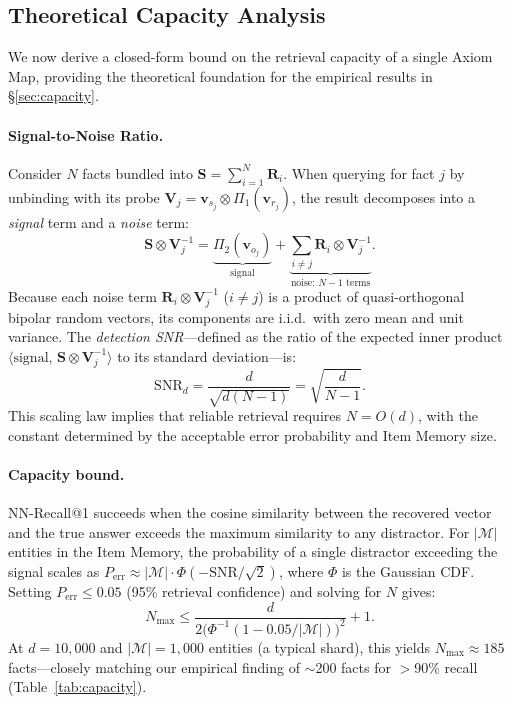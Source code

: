 \documentclass[11pt,a4paper]{article}
\begin{document}
\subsection{Theoretical Capacity Analysis}
\label{sec:theory}

We now derive a closed-form bound on the retrieval capacity of a single
Axiom Map, providing the theoretical foundation for the empirical results
in \S\ref{sec:capacity}.

\paragraph{Signal-to-Noise Ratio.}
Consider $N$ facts bundled into $\mathbf{S} = \sum_{i=1}^{N} \mathbf{R}_i$.
When querying for fact $j$ by unbinding with its probe
$\mathbf{V}_j = \mathbf{v}_{s_j} \otimes \Pi_1(\mathbf{v}_{r_j})$, the
result decomposes into a \emph{signal} term and a \emph{noise} term:
\begin{equation}
    \mathbf{S} \otimes \mathbf{V}_j^{-1}
    = \underbrace{\Pi_2(\mathbf{v}_{o_j})}_{\text{signal}}
    + \underbrace{\sum_{i \neq j} \mathbf{R}_i \otimes
      \mathbf{V}_j^{-1}}_{\text{noise: } N-1 \text{ terms}}.
    \label{eq:snr_decomp}
\end{equation}
Because each noise term $\mathbf{R}_i \otimes \mathbf{V}_j^{-1}$
($i \neq j$) is a product of quasi-orthogonal bipolar random vectors, its
components are i.i.d.\ with zero mean and unit variance.  The
\emph{detection SNR}---defined as the ratio of the expected inner product
$\langle\text{signal},\,\mathbf{S}\otimes\mathbf{V}_j^{-1}\rangle$ to its
standard deviation---is:
\begin{equation}
    \text{SNR}_d
    = \frac{d}{\sqrt{d(N-1)}}
    = \sqrt{\frac{d}{N-1}}.
    \label{eq:snr}
\end{equation}
This scaling law implies that reliable retrieval requires $N = O(d)$,
with the constant determined by the acceptable error probability and
Item Memory size.

\paragraph{Capacity bound.}
NN-Recall@1 succeeds when the cosine similarity between the recovered
vector and the true answer exceeds the maximum similarity to any
distractor.  For $|\mathcal{M}|$ entities in the Item Memory, the
probability of a single distractor exceeding the signal scales as
$P_{\text{err}} \approx |\mathcal{M}| \cdot
\Phi(-\text{SNR}/\sqrt{2})$, where $\Phi$ is the Gaussian CDF.
Setting $P_{\text{err}} \leq 0.05$ (95\% retrieval confidence) and
solving for $N$ gives:
\begin{equation}
    N_{\max} \leq \frac{d}{2\bigl(
    \Phi^{-1}(1 - 0.05/|\mathcal{M}|)\bigr)^2} + 1.
    \label{eq:capacity_bound}
\end{equation}
At $d = 10{,}000$ and $|\mathcal{M}| = 1{,}000$ entities (a typical
shard), this yields $N_{\max} \approx 185$ facts---closely matching
our empirical finding of $\sim$200 facts for $>$90\% recall
(Table~\ref{tab:capacity}).
\end{document}
